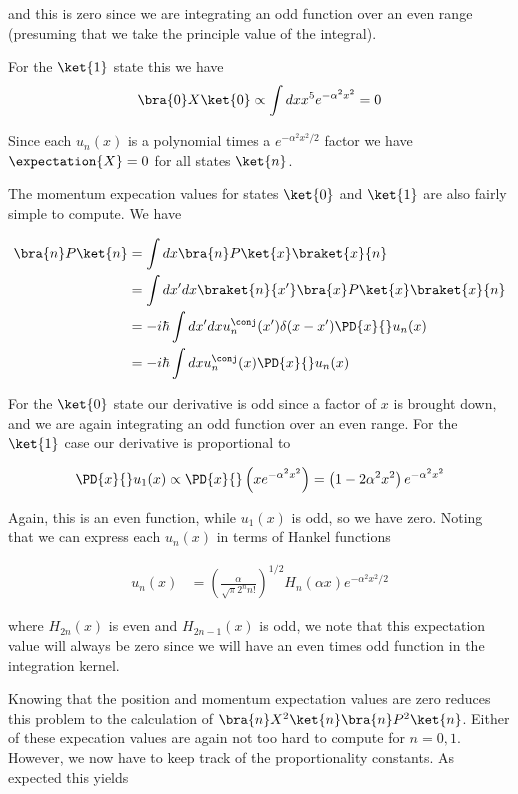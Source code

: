 and this is zero since we are integrating an odd function over an even range (presuming that we take the principle value of the integral).

For the $\ket{1}$ state this we have
\begin{align*}
\bra{0} X \ket{0} 
\propto
\int dx x^5 e^{-\alpha^2 x^2} 
= 0
\end{align*}

Since each $u_n(x)$ is a polynomial times a $e^{-\alpha^2 x^2/2}$ factor we have $\expectation{X} = 0$ for all states $\ket{n}$.

The momentum expecation values for states $\ket{0}$ and $\ket{1}$ are also fairly simple to compute.  We have

\begin{align*}
\bra{n} P \ket{n} 
&=
\int dx \bra{n} P \ket{x}\braket{x}{n} \\
&=
\int dx' dx \braket{n}{x'} \bra{x} P \ket{x} \braket{x}{n} \\
&=
-i \hbar \int dx' dx u_n^\conj(x') \delta(x-x') \PD{x}{} u_n(x) \\
&=
-i \hbar \int dx u_n^\conj(x) \PD{x}{} u_n(x) \\
\end{align*}

For the $\ket{0}$ state our derivative is odd since a factor of $x$ is brought down, and we are again integrating an odd function over an even range.  For the $\ket{1}$ case our derivative is proportional to

\begin{align*}
\PD{x}{} u_1(x) 
\propto
\PD{x}{} \left( x e^{-\alpha^2 x^2 } \right)
=
\left( 1 -2 \alpha^2 x^2 \right) e^{-\alpha^2 x^2 } 
\end{align*}

Again, this is an even function, while $u_1(x)$ is odd, so we have zero.  Noting that we can express each $u_n(x)$ in terms of Hankel functions

\begin{align}\label{eqn:desaiCh9:302}
u_n(x) &= \left( \frac{ \alpha}{\sqrt{\pi} 2^n n!} \right)^{1/2} H_n(\alpha x) e^{ -\alpha^2 x^2/2}
\end{align}

where $H_{2n}(x)$ is even and $H_{2n-1}(x)$ is odd, we note that this expectation value will always be zero since we will have an even times odd function in the integration kernel.

Knowing that the position and momentum expectation values are zero reduces this problem to the calculation of $\bra{n} X^2 \ket{n} \bra{n} P^2 \ket{n}$.  Either of these expecation values are again not too hard to compute for $n=0,1$.  However, we now have to keep track of the proportionality constants.  As expected this yields

